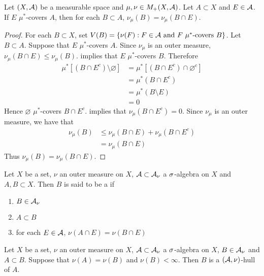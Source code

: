 \documentclass{book}
\begin{document}
	\begin{ex}   
		Let $(X, \mathcal{A})$ be a measurable space and $\mu, \nu \in M_+(X, \mathcal{A})$. Let $A \subset X$ and $E \in \mathcal{A}$. If $E$ $\mu^*$-covers $A$, then for each $B \subset A$, $\nu_{\mu}(B) = \nu_{\mu}(B \cap E)$.
	\end{ex}

	\begin{proof}
		For each $B \subset X$, set $V(B) = \{\nu(F): F \in \mathcal{A} \text{ and $F$ $\mu^*$-covers $B$}\}$. Let $B \subset A$. Suppose that $E$ $\mu^*$-covers $A$. Since $\nu_{\mu}$ is an outer measure, $\nu_{\mu}(B \cap E) \leq \nu_{\mu}(B)$.  implies that $E$ $\mu^*$-covers $B$. Therefore 
		\begin{align*}
			\mu^*[ (B \cap E^c) \setminus \varnothing] 
			& = \mu^*[ (B \cap E^c) \cap \varnothing^c] \\
			& = \mu^*(B \cap E^c) \\
			& = \mu^*(B \setminus E) \\
			& = 0
		\end{align*}
		Hence $\varnothing$ $\mu^*$-covers $B \cap E^c$.  implies that $\nu_{\mu}(B \cap E^c) = 0$.
		Since $\nu_{\mu}$ is an outer measure, we have that
		\begin{align*}
			\nu_{\mu}(B)
			& \leq \nu_{\mu}(B \cap E) + \nu_{\mu}(B \cap E^c) \\
			& = \nu_{\mu}(B \cap E)
		\end{align*}
		Thus $\nu_{\mu}(B) = \nu_{\mu}(B \cap E)$.
	\end{proof}
	
	\begin{defn}  
		Let $X$ be a set, $\nu$ an outer measure on $X$, $\mathcal{A} \subset \mathcal{A}_{\nu}$ a $\sigma$-algebra on $X$ and $A, B \subset X$. Then $B$ is said to be a  if 
		\begin{enumerate}
			\item $B \in \mathcal{A}_{\nu}$
			\item $A \subset B$
			\item for each $E \in \mathcal{A}$, $\nu(A \cap E) = \nu(B \cap E)$
		\end{enumerate} 
	\end{defn}
	
	\begin{ex}  
		Let $X$ be a set, $\nu$ an outer measure on $X$, $\mathcal{A} \subset \mathcal{A}_{\nu}$ a $\sigma$-algebra on $X$, $B \in \mathcal{A}_{\nu}$ and $A \subset B$. Suppose that $\nu(A) = \nu(B)$ and $\nu(B) < \infty$. Then $B$ is a $(\mathcal{A}, \nu)$-hull of $A$.
	\end{ex}
\end{document}
